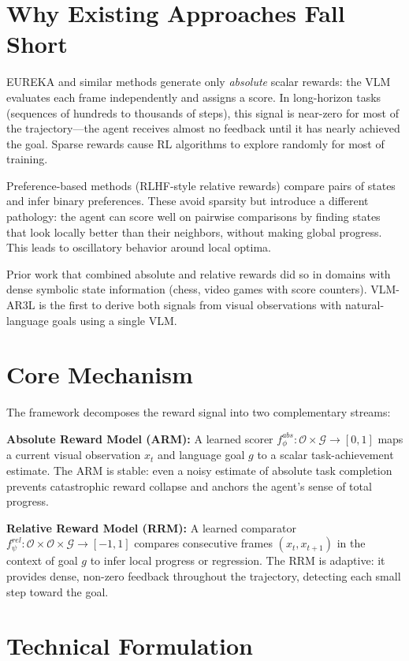 \documentclass[10pt,twocolumn]{article}
\begin{document}
\section{Why Existing Approaches Fall Short}

EUREKA and similar methods generate only \emph{absolute} scalar rewards:
the VLM evaluates each frame independently and assigns a score. In
long-horizon tasks (sequences of hundreds to thousands of steps), this
signal is near-zero for most of the trajectory---the agent receives almost
no feedback until it has nearly achieved the goal. Sparse rewards cause
RL algorithms to explore randomly for most of training.

Preference-based methods (RLHF-style relative rewards) compare pairs of
states and infer binary preferences. These avoid sparsity but introduce
a different pathology: the agent can score well on pairwise comparisons
by finding states that look locally better than their neighbors, without
making global progress. This leads to oscillatory behavior around local
optima.

Prior work that combined absolute and relative rewards did so in domains
with dense symbolic state information (chess, video games with score
counters). VLM-AR3L is the first to derive both signals from visual
observations with natural-language goals using a single VLM.

\section{Core Mechanism}

The framework decomposes the reward signal into two complementary streams:

\textbf{Absolute Reward Model (ARM):} A learned scorer
$f_\phi^{abs}: \mathcal{O} \times \mathcal{G} \to [0,1]$ maps a
current visual observation $x_t$ and language goal $g$ to a scalar
task-achievement estimate. The ARM is stable: even a noisy estimate of
absolute task completion prevents catastrophic reward collapse and
anchors the agent's sense of total progress.

\textbf{Relative Reward Model (RRM):} A learned comparator
$f_\psi^{rel}: \mathcal{O} \times \mathcal{O} \times \mathcal{G} \to [-1,1]$
compares consecutive frames $(x_t, x_{t+1})$ in the context of goal $g$
to infer local progress or regression. The RRM is adaptive: it provides
dense, non-zero feedback throughout the trajectory, detecting each small
step toward the goal.

\section{Technical Formulation}
\end{document}

